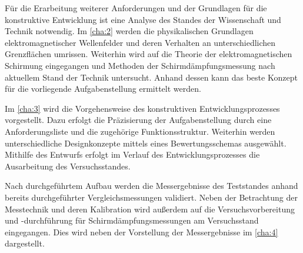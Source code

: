 Für die Erarbeitung weiterer Anforderungen und der Grundlagen für die konstruktive Entwicklung ist eine Analyse des Standes der Wissenschaft und Technik notwendig. Im \Kapitel\ref{cha:2} werden die physikalischen Grundlagen elektromagnetischer Wellenfelder und deren Verhalten an unterschiedlichen Grenzflächen umrissen. Weiterhin wird auf die Theorie der elektromagnetischen Schirmung eingegangen und Methoden der Schirmdämpfungsmessung nach aktuellem Stand der Technik untersucht. Anhand dessen kann das beste Konzept für die vorliegende Aufgabenstellung ermittelt werden.
\par
\vspace{\linespace}
Im \Kapitel\ref{cha:3} wird die Vorgehensweise des konstruktiven Entwicklungsprozesses vorgestellt. Dazu erfolgt die Präzisierung der Aufgabenstellung durch eine Anforderungsliste und die zugehörige Funktionsstruktur. Weiterhin werden unterschiedliche Designkonzepte mittels eines Bewertungsschemas ausgewählt. Mithilfe des Entwurfs erfolgt im Verlauf des Entwicklungsprozesses die Ausarbeitung des Versuchs\-standes. 
\par
\vspace{\linespace}
Nach durchgeführtem Aufbau werden die Messergebnisse des Teststandes anhand bereits durchgeführter Vergleichsmessungen validiert. Neben der Betrachtung der Messtechnik und deren Kalibration wird außerdem auf die Versuchsvorbereitung und -durchführung für Schirmdämpfungsmessungen am Versuchsstand eingegangen. Dies wird neben der Vorstellung der Messergebnisse im \Kapitel\ref{cha:4} dargestellt.

